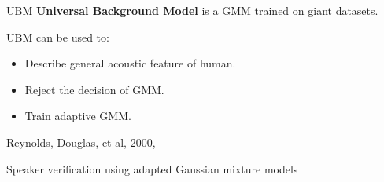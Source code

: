 \begin{frame}{UBM}
  \textbf{Universal Background Model} is a GMM trained on giant datasets.

  UBM can be used to:
  \begin{itemize}
    \item Describe general acoustic feature of human.
    \item Reject the decision of GMM.
    \item Train adaptive GMM.
  \end{itemize}

  \begin{reference}{4mm}{85mm}
    Reynolds, Douglas, et al, 2000,

    Speaker verification using adapted Gaussian mixture models
  \end{reference}
\end{frame}

